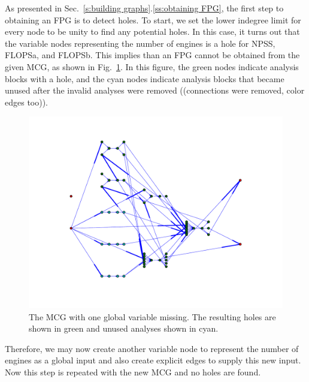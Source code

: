 	As presented in Sec.~\ref{s:building graphs}.\ref{ss:obtaining FPG}, the first step to obtaining an FPG is to detect holes. To start, we set the lower indegree limit for every node to be unity to find any potential holes. In this case, it turns out that the variable nodes representing the number of engines is a hole for NPSS, FLOPSa, and FLOPSb. This implies than an FPG cannot be obtained from the given MCG, as shown in Fig.~\ref{f:MCG nengines}. In this figure, the green nodes indicate analysis blocks with a hole, and the cyan nodes indicate analysis blocks that became unused after the invalid analyses were removed ((connections were removed, color edges too)).
	\begin{figure}[htb!]
	  \begin{center}
		\includegraphics[width=.6\textwidth]{images/MCG_nengines}
	  \end{center}
	  \caption{The MCG with one global variable missing. The resulting holes are shown in green and unused analyses shown in cyan.}
	\label{f:MCG nengines}
	\end{figure}

	Therefore, we may now create another variable node to represent the number of engines as a global input and also create explicit edges to supply this new input. Now this step is repeated with the new MCG and no holes are found.

